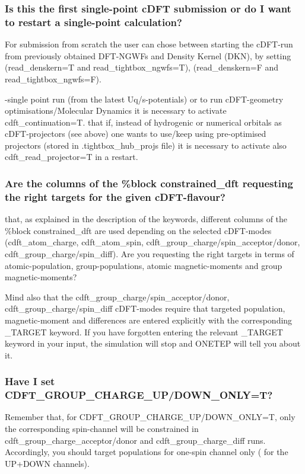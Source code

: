 \documentclass[letterpaper,10pt,english]{sphinxmanual}
\begin{document}
\subsubsection{Is this the first single-point cDFT submission or do I want to restart a single-point calculation?}
\label{\detokenize{cDFT:is-this-the-first-single-point-cdft-submission-or-do-i-want-to-restart-a-single-point-calculation}}
For submission from scratch the user can chose between starting the
cDFT-run from previously obtained DFT-NGWFs and Density Kernel (DKN), by
setting (read\_denskern=T and read\_tightbox\_ngwfs=T), 
(read\_denskern=F and read\_tightbox\_ngwfs=F).

-single point run (from the latest Uq/s-potentials)
or to run cDFT-geometry optimisations/Molecular Dynamics it is necessary
to activate cdft\_continuation=T.  that if, instead of
hydrogenic or numerical orbitals as cDFT-projectors (see above) one
wants to use/keep using pre-optimised projectors (stored in
.tightbox\_hub\_projs file) it is necessary to activate also
cdft\_read\_projector=T in a restart.


\subsubsection{Are the columns of the \%block constrained\_dft requesting the right targets for the given cDFT-flavour?}
\label{\detokenize{cDFT:are-the-columns-of-the-block-constrained-dft-requesting-the-right-targets-for-the-given-cdft-flavour}}
 that, as explained in the description of the keywords,
different columns of the \%block constrained\_dft are used depending on
the selected cDFT-modes (cdft\_atom\_charge, cdft\_atom\_spin,
cdft\_group\_charge/spin\_acceptor/donor,
cdft\_group\_charge/spin\_diff). Are you requesting the right targets in
terms of atomic-population, group-populations, atomic magnetic-moments
and group magnetic-moments?

Mind also that the cdft\_group\_charge/spin\_acceptor/donor,
cdft\_group\_charge/spin\_diff cDFT-modes require that targeted
population, magnetic-moment and differences are entered explicitly with
the corresponding \_TARGET keyword. If you have forgotten entering the
relevant \_TARGET keyword in your input, the simulation will stop and
ONETEP will tell you about it.


\subsubsection{Have I set CDFT\_GROUP\_CHARGE\_UP/DOWN\_ONLY=T?}
\label{\detokenize{cDFT:have-i-set-cdft-group-charge-up-down-only-t}}
Remember that, for CDFT\_GROUP\_CHARGE\_UP/DOWN\_ONLY=T, only the
corresponding spin-channel will be constrained in
cdft\_group\_charge\_acceptor/donor and cdft\_group\_charge\_diff runs.
Accordingly, you should target populations for one-spin channel only
( for the UP+DOWN channels).
\end{document}
